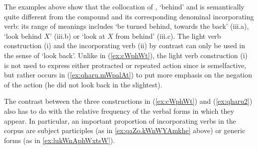 The examples above show that the collocation of , `behind' and  is semantically quite different from the compound    and its corresponding denominal incorporating verb: its range of meanings includes `be turned behind, towards the back' (iii.a), `look behind $X$' (iii.b) or `look at $X$ from behind' (iii.c). The light verb construction (i) and the incorporating verb (ii) by contrast can only be used in the sense of `look back'. Unlike in (\ref{ex:cWphWt}), the light verb construction (i) is not used to express either protracted or repeated action since   is semelfactive, but rather  occurs in (\ref{ex:qharu.mWpalAt}) to put more emphasis on the negation of the action (he did not look back in the slightest).


The contrast between the three constructions in (\ref{ex:cWphWt}) and (\ref{ex:qharu2}) also has to do with the relative frequency of the verbal forms in which they appear. In particular, an important proportion of incorporating verbs in the corpus are subject participles (as in \ref{ex:qaZo.kWnWYAmkhe} above) or generic forms (as in \ref{ex:lukWnAphWxtsW}).


